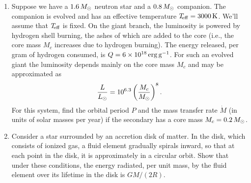\begin{enumerate}
\item Suppose we have a $1.6\,M_\odot$ neutron star and a $0.8\,M_\odot$ companion.  The companion is evolved and has an effective temperature $T_{\!\mathrm{eff}} = 3000\,\mathrm{K}$.  We'll assume that $T_{\!\mathrm{eff}}$ is fixed.  On the giant branch, the luminosity is powered by hydrogen shell burning, the ashes of which are added to the core (i.e., the core mass $M_{c}$ increases due to hydrogen burning).  The energy released, per gram of hydrogen consumed, is $Q = 6\times 10^{18}\,\mathrm{erg}\,\mathrm{g}^{-1}$. For such an evolved giant the luminosity depends mainly on the core mass $M_{c}$ and may be approximated as \citep{Ritter1999Analytical-solu}
\[
	\frac{L}{L_{\odot}} = 10^{6.3}\left(\frac{M_{c}}{M_\odot}\right)^{8}.
\]
For this system, find the orbital period $P$ and the mass transfer rate $\dot{M}$ (in units of solar masses per year) if the secondary has a core mass $M_{c} = 0.2\,M_\odot$. 

\item \label{p.disk-L} Consider a star surrounded by an accretion disk of matter.  In the disk, which consists of ionized gas, a fluid element gradually spirals inward, so that at each point in the disk, it is approximately in a circular orbit.  Show that under these conditions, the energy radiated, per unit mass, by the fluid element over its lifetime in the disk is $GM/(2R)$.

\end{enumerate}
